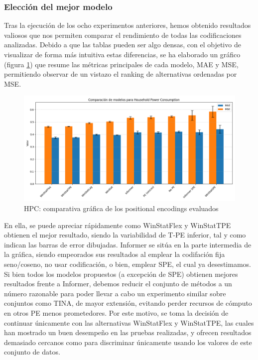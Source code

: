 \subsubsection{Elección del mejor modelo}

Tras la ejecución de los ocho experimentos anteriores, hemos obtenido resultados valiosos que nos permiten comparar el rendimiento de todas las codificaciones analizadas. Debido a que las tablas pueden ser algo densas, con el objetivo de visualizar de forma más intuitiva estas diferencias, se ha elaborado un gráfico (figura \ref{hpcgraph}) que resume las métricas principales de cada modelo, MAE y MSE, permitiendo observar de un vistazo el ranking de alternativas ordenadas por MSE.\\

\begin{figure}[!ht]
	\centering
	\includegraphics[scale=0.475]{img/hpcgraph}
	\caption{HPC: comparativa gráfica de los positional encodings evaluados}
	\label{hpcgraph}
\end{figure}

En ella, se puede apreciar rápidamente como WinStatFlex y WinStatTPE obtienen el mejor resultado, siendo la variabilidad de T-PE inferior, tal y como indican las barras de error dibujadas.  Informer se sitúa en la parte intermedia de la gráfica, siendo empeorados sus resultados al emplear la codifación fija seno/coseno, no usar codificación, o bien, emplear SPE, el cual ya desestimamos.\\

Si bien todos los modelos propuestos (a excepción de SPE) obtienen mejores resultados frente a Informer, debemos reducir el conjunto de métodos a un número razonable para poder llevar a cabo un experimento similar sobre conjuntos como TINA, de mayor extensión, evitando perder recursos de cómputo en otros PE menos prometedores. Por este motivo, se toma la decisión de continuar únicamente con las alternativas WinStatFlex y WinStatTPE, las cuales han mostrado un buen desempeño en las pruebas realizadas, y ofrecen resultados demasiado cercanos como para discriminar únicamente usando los valores de este conjunto de datos.\\


